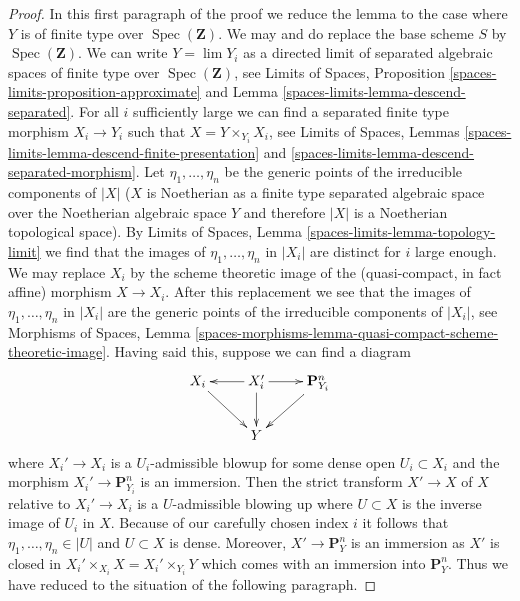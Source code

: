 \documentclass[10pt,a4paper]{amsart}
\theoremstyle{plain}
\theoremstyle{definition}
\theoremstyle{remark}
\numberwithin{equation}{subsection}
\def\lim{\mathop{\mathrm{lim}}\nolimits}
\def\Spec{\mathop{\mathrm{Spec}}}
\begin{document}
\begin{proof}
In this first paragraph of the proof we reduce the lemma to the case
where $Y$ is of finite type over $\Spec(\mathbf{Z})$.
We may and do replace the base scheme $S$ by $\Spec(\mathbf{Z})$.
We can write $Y = \lim Y_i$ as a directed limit of separated
algebraic spaces of finite type over $\Spec(\mathbf{Z})$, see
Limits of Spaces, Proposition \ref{spaces-limits-proposition-approximate} and
Lemma \ref{spaces-limits-lemma-descend-separated}.
For all $i$ sufficiently large we can find a separated finite type morphism
$X_i \to Y_i$ such that $X = Y \times_{Y_i} X_i$, see
Limits of Spaces, Lemmas
\ref{spaces-limits-lemma-descend-finite-presentation} and
\ref{spaces-limits-lemma-descend-separated-morphism}.
Let $\eta_1, \ldots, \eta_n$ be the generic points of the irreducible
components of $|X|$ ($X$ is Noetherian as a finite type separated
algebraic space over the Noetherian algebraic space $Y$ and therefore
$|X|$ is a Noetherian topological space).
By Limits of Spaces, Lemma \ref{spaces-limits-lemma-topology-limit}
we find that the images of $\eta_1, \ldots, \eta_n$ in $|X_i|$
are distinct for $i$ large enough. We may replace
$X_i$ by the scheme theoretic image of the (quasi-compact, in fact affine)
morphism $X \to X_i$.
After this replacement we see that the images
of $\eta_1, \ldots, \eta_n$ in $|X_i|$ are the generic points of the
irreducible components of $|X_i|$, see
Morphisms of Spaces, Lemma
\ref{spaces-morphisms-lemma-quasi-compact-scheme-theoretic-image}.
Having said this, suppose we can find a diagram
$$
\xymatrix{
X_i \ar[rd] & X_i' \ar[l] \ar[d] \ar[r] & \mathbf{P}^n_{Y_i} \ar[ld] \\
& Y
}
$$
where $X_i' \to X_i$ is a $U_i$-admissible blowup for some dense open
$U_i \subset X_i$ and the morphism $X_i' \to \mathbf{P}^n_{Y_i}$
is an immersion. Then the strict transform $X' \to X$ of $X$ relative
to $X_i' \to X_i$ is a $U$-admissible blowing up where $U \subset X$
is the inverse image of $U_i$ in $X$. Because of our carefully chosen
index $i$ it follows that $\eta_1, \ldots, \eta_n \in |U|$ and
$U \subset X$ is dense. Moreover, $X' \to \mathbf{P}^n_Y$ is an
immersion as $X'$ is closed in
$X_i' \times_{X_i} X = X_i' \times_{Y_i} Y$
which comes with an immersion into $\mathbf{P}^n_Y$. Thus we have reduced
to the situation of the following paragraph.


\end{proof}
\end{document}
